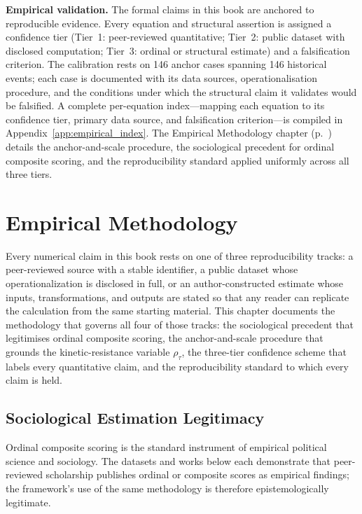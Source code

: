 \documentclass[12pt,openany]{book}
\numberwithin{equation}{chapter}
\begin{document}
\medskip
\noindent\textbf{Empirical validation.} The formal claims in this book are anchored to reproducible evidence. Every equation and structural assertion is assigned a confidence tier (Tier~1: peer-reviewed quantitative; Tier~2: public dataset with disclosed computation; Tier~3: ordinal or structural estimate) and a falsification criterion. The calibration rests on 146 anchor cases spanning 146 historical events; each case is documented with its data sources, operationalisation procedure, and the conditions under which the structural claim it validates would be falsified. A complete per-equation index---mapping each equation to its confidence tier, primary data source, and falsification criterion---is compiled in Appendix~\ref{app:empirical_index}. The Empirical Methodology chapter (p.~\pageref{ch:empirical_methodology}) details the anchor-and-scale procedure, the sociological precedent for ordinal composite scoring, and the reproducibility standard applied uniformly across all three tiers.

\chapter*{Empirical Methodology}
\label{ch:empirical_methodology}

Every numerical claim in this book rests on one of three reproducibility tracks: a peer-reviewed source with a stable identifier, a public dataset whose operationalization is disclosed in full, or an author-constructed estimate whose inputs, transformations, and outputs are stated so that any reader can replicate the calculation from the same starting material. This chapter documents the methodology that governs all four of those tracks: the sociological precedent that legitimises ordinal composite scoring, the anchor-and-scale procedure that grounds the kinetic-resistance variable $\rho_\tau$, the three-tier confidence scheme that labels every quantitative claim, and the reproducibility standard to which every claim is held.

\section*{Sociological Estimation Legitimacy}

Ordinal composite scoring is the standard instrument of empirical political science and sociology. The datasets and works below each demonstrate that peer-reviewed scholarship publishes ordinal or composite scores as empirical findings; the framework's use of the same methodology is therefore epistemologically legitimate.
\end{document}
